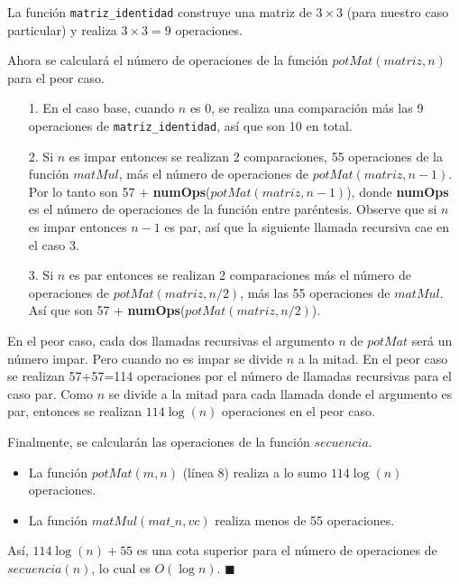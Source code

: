\documentclass{article}
\begin{document}
La función \texttt{matriz\_identidad} construye una matriz de $3 \times 3$ (para nuestro caso particular) y realiza $3 \times 3=9$ operaciones.

Ahora se calculará el número de operaciones de la función $potMat(matriz, n)$ para el peor caso.
\begin{itemize}
\item[1.] En el caso base, cuando $n$ es 0, se realiza una comparación más las 9 operaciones de \texttt{matriz\_identidad}, así que son 10 en total.
\item[2.] Si $n$ es impar entonces se realizan 2 comparaciones, 55 operaciones de la función $matMul$, más el número de operaciones de $potMat(matriz, n-1)$. Por lo tanto son 57 + \textbf{numOps}($potMat(matriz, n-1)$), donde \textbf{numOps} es el número de operaciones de la función entre paréntesis. Observe que si $n$ es impar entonces $n-1$ es par, así que la siguiente llamada recursiva cae en el caso 3.
\item[3.] Si $n$ es par entonces se realizan 2 comparaciones más el número de operaciones de $potMat(matriz, n/2)$, más las 55 operaciones de $matMul$. Así que son 57 + \textbf{numOps}($potMat(matriz, n/2)$).
\end{itemize}

En el peor caso, cada dos llamadas recursivas el argumento $n$ de $potMat$ será un número impar. Pero cuando no es impar se divide $n$ a la mitad. En el peor caso se realizan 57+57=114 operaciones por el número de llamadas recursivas para el caso par. Como $n$ se divide a la mitad para cada llamada donde el argumento es par, entonces se realizan $114 \log (n)$ operaciones en el peor caso.

Finalmente, se calcularán las operaciones de la función $secuencia$.
\begin{itemize}
\item La función $potMat(m,n)$ (línea 8) realiza a lo sumo $114 \log (n)$ operaciones.
\item La función $matMul(mat\_n, vc)$ realiza menos de 55 operaciones.
\end{itemize}

Así, $114 \log(n) + 55$ es una cota superior para el número de operaciones de $secuencia(n)$, lo cual es $O(\log n)$. $\blacksquare$
\end{document}
